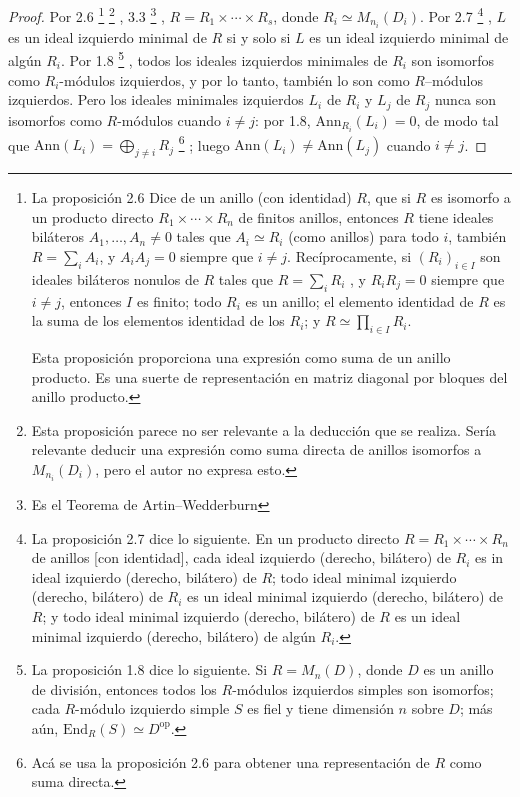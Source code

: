 \documentclass{article}
\newcommand{\End}{\text{End}}
\begin{document}
\begin{proof}
    Por 2.6
    \footnote{
        La proposición 2.6 Dice de un anillo (con identidad) $R$, que si $R$ es isomorfo a un producto directo $R_1 \times \cdots \times R_n$ de finitos anillos, entonces $R$ tiene ideales biláteros $A_1, \dots, A_n \neq 0$ tales que $A_i \simeq R_i$ (como anillos) para todo $i$, también $R = \sum_i A_i$, y $A_i A_j = 0$ siempre que $i \neq j$.
        Recíprocamente, si $(R_i)_{i \in I }$ son ideales biláteros nonulos de $R$ tales que $R = \sum_i R_i$ , y $R_i R_j = 0$ siempre que $i \neq j$, entonces $I$ es finito; todo $R_i$ es un anillo; el elemento identidad de $R$ es la suma de los elementos identidad de los $R_i$; y $R \simeq \prod_{i \in I} R_i$.

        Esta proposición proporciona una expresión como suma de un anillo producto.
        Es una suerte de representación en matriz diagonal por bloques del anillo producto.
    }
    \footnote{
        Esta proposición parece no ser relevante a la deducción que se realiza.
        Sería relevante deducir una expresión como suma directa de anillos isomorfos a $M_{n_i}(D_i)$, pero el autor no expresa esto.
    }
    , 3.3
    \footnote{Es el Teorema de Artin--Wedderburn}
    , $R = R_1 \times \cdots \times R_s$, donde $R_i \simeq M_{n_i}(D_i)$.
    Por 2.7
    \footnote{
        La proposición 2.7 dice lo siguiente.
        En un producto directo $R = R_1 \times \cdots \times R_n$ de anillos [con identidad], cada ideal izquierdo (derecho, bilátero) de $R_i$ es in ideal izquierdo (derecho, bilátero) de $R$; todo ideal minimal izquierdo (derecho, bilátero) de $R_i$ es un ideal minimal izquierdo (derecho, bilátero) de $R$; y todo ideal minimal izquierdo (derecho, bilátero) de $R$ es un ideal minimal izquierdo (derecho, bilátero) de algún $R_i$.
    }
    , $L$ es un ideal izquierdo minimal de $R$ si y solo si $L$ es un ideal izquierdo minimal de algún $R_i$.
    Por 1.8
    \footnote{
        La proposición 1.8 dice lo siguiente.
        Si $R = M_n(D)$, donde $D$ es un anillo de división, entonces todos los $R$-módulos izquierdos simples son isomorfos; cada $R$-módulo izquierdo simple $S$ es fiel y tiene dimensión $n$ sobre $D$; más aún, $\End_R(S) \simeq D^{\text{op}}$.
    }
    , todos los ideales izquierdos minimales de $R_i$ son isomorfos como $R_i$-módulos izquierdos, y por lo tanto, también lo son como $R$--módulos izquierdos.
    Pero los ideales minimales izquierdos $L_i$ de $R_i$ y $L_j$ de $R_j$ nunca son isomorfos como $R$-módulos cuando $i \neq j$: por 1.8, $\text{Ann}_{R_i}(L_i) = 0$, de modo tal que $\text{Ann}(L_i) = \bigoplus_{j \neq i} R_j$
    \footnote{
        Acá se usa la proposición 2.6 para obtener una representación de $R$ como suma directa.
    }
    ; luego $\text{Ann}(L_i) \neq \text{Ann}(L_j)$ cuando $i \neq j$.
\end{proof}
\end{document}
